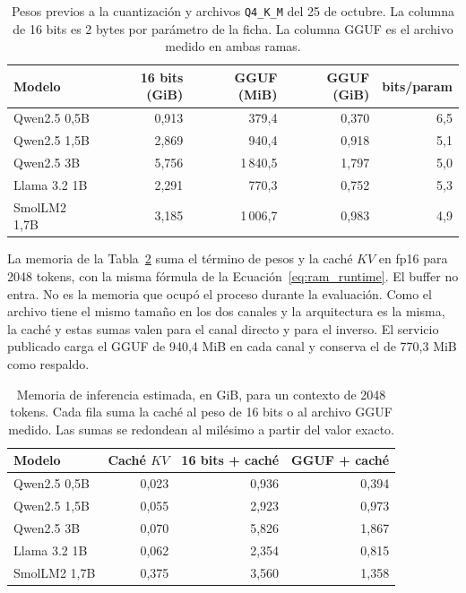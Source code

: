 \begin{table}[H]
\centering
\footnotesize
\caption{Pesos previos a la cuantización y archivos \texttt{Q4\_K\_M} del 25 de octubre. La columna de 16 bits es 2 bytes por parámetro de la ficha. La columna GGUF es el archivo medido en ambas ramas.}
\label{tab:pesos_cuant}
\begin{tabular}{lrrrr}
\toprule
\textbf{Modelo} & \textbf{16 bits (GiB)} & \textbf{GGUF (MiB)} & \textbf{GGUF (GiB)} & \textbf{bits/param} \\
\midrule
Qwen2.5 0,5B & 0,913 & 379,4 & 0,370 & 6,5 \\
Qwen2.5 1,5B & 2,869 & 940,4 & 0,918 & 5,1 \\
Qwen2.5 3B   & 5,756 & 1\,840,5 & 1,797 & 5,0 \\
Llama 3.2 1B & 2,291 & 770,3 & 0,752 & 5,3 \\
SmolLM2 1,7B & 3,185 & 1\,006,7 & 0,983 & 4,9 \\
\bottomrule
\end{tabular}
\end{table}

La memoria de la Tabla~\ref{tab:ram_inferencia} suma el término de pesos y la caché \(KV\) en fp16 para 2048 tokens, con la misma fórmula de la Ecuación~\ref{eq:ram_runtime}. El buffer no entra. No es la memoria que ocupó el proceso durante la evaluación. Como el archivo tiene el mismo tamaño en los dos canales y la arquitectura es la misma, la caché y estas sumas valen para el canal directo y para el inverso. El servicio publicado carga el GGUF de 940,4 MiB en cada canal y conserva el de 770,3 MiB como respaldo.

\begin{table}[H]
\centering
\footnotesize
\caption{Memoria de inferencia estimada, en GiB, para un contexto de 2048 tokens. Cada fila suma la caché al peso de 16 bits o al archivo GGUF medido. Las sumas se redondean al milésimo a partir del valor exacto.}
\label{tab:ram_inferencia}
\begin{tabular}{lrrr}
\toprule
\textbf{Modelo} & \textbf{Caché \(KV\)} & \textbf{16 bits + caché} & \textbf{GGUF + caché} \\
\midrule
Qwen2.5 0,5B & 0,023 & 0,936 & 0,394 \\
Qwen2.5 1,5B & 0,055 & 2,923 & 0,973 \\
Qwen2.5 3B   & 0,070 & 5,826 & 1,867 \\
Llama 3.2 1B & 0,062 & 2,354 & 0,815 \\
SmolLM2 1,7B & 0,375 & 3,560 & 1,358 \\
\bottomrule
\end{tabular}
\end{table}

